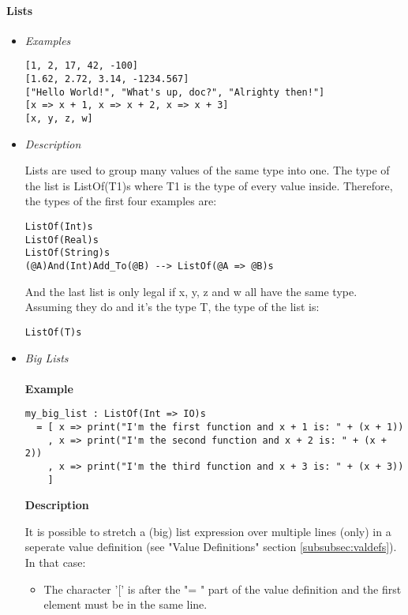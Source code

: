 \documentclass{article}
\begin{document}
\paragraph{Lists}

\begin{itemize}

\item \textit{Examples}
\begin{verbatim}
[1, 2, 17, 42, -100]
[1.62, 2.72, 3.14, -1234.567]
["Hello World!", "What's up, doc?", "Alrighty then!"]
[x => x + 1, x => x + 2, x => x + 3]
[x, y, z, w]
\end{verbatim}

\item \textit{Description}

Lists are used to group many values of the same type into one. 
The type of the list is ListOf(T1)s where T1 is the type of every value inside.
Therefore, the types of the first four examples are:
\begin{verbatim}
ListOf(Int)s
ListOf(Real)s
ListOf(String)s
(@A)And(Int)Add_To(@B) --> ListOf(@A => @B)s
\end{verbatim}
And the last list is only legal if x, y, z and w all have the same type. Assuming 
they do and it's the type T, the type of the list is: 
\begin{verbatim}
ListOf(T)s
\end{verbatim}

\item \textit{Big Lists}
  \\\\
  \textbf{Example}

  \begin{verbatim}
my_big_list : ListOf(Int => IO)s
  = [ x => print("I'm the first function and x + 1 is: " + (x + 1))
    , x => print("I'm the second function and x + 2 is: " + (x + 2))
    , x => print("I'm the third function and x + 3 is: " + (x + 3))
    ]
  \end{verbatim}

  \textbf{Description} 

  It is possible to stretch a (big) list expression over multiple lines (only) in
  a seperate value definition (see "Value Definitions" section
  \ref{subsubsec:valdefs}).  In that case:
  \begin{itemize}
  \item
  The character '[' is after the "= " part of the value definition
  and the first element must be in the same line.


\end{itemize}
\end{itemize}
\end{document}
